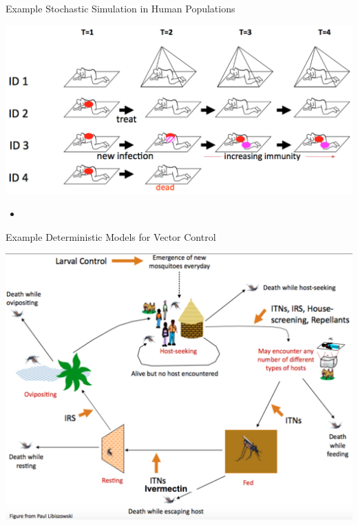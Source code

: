 \documentclass{beamer}
\begin{document}
\begin{frame}{Example Stochastic Simulation in Human Populations}

\centering
\includegraphics[width=1\textwidth]{images/Humans.png}
 
\begin{itemize}
\item \cite{Stuckey2012}
\end{itemize}

\end{frame}

\begin{frame}{Example Deterministic Models for Vector Control}

\centering
\includegraphics[width=1\textwidth]{images/MosquitoLifeCycle.png}


\end{frame}
\end{document}
